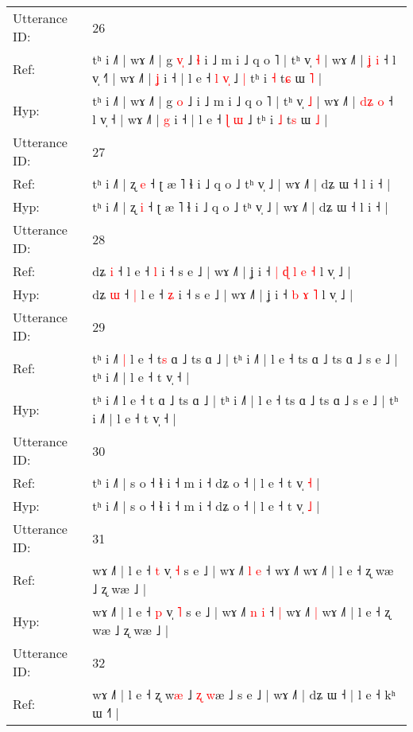 \documentclass[10pt]{article}
\DeclareRobustCommand{\hl}[1]{{\textcolor{red}{#1}}}
\begin{document}
\begin{longtable}{ll}
 \\
\midrule
Utterance ID: & 26 \\
Ref: & tʰ i ˩˥ | wɤ ˩˥ | g \hl{v}\hl{̩} ˩\hl{ }\hl{ɬ} i ˩ m i ˩ q o ˥ | tʰ v̩ \hl{˧} | wɤ ˩˥ | \hl{}\hl{ʝ} \hl{i} ˧ l v̩ ˧\hl{˥} | wɤ ˩˥ | \hl{ʝ} i ˧ | l e ˧ \hl{l} \hl{v}\hl{̩} ˩\hl{ }\hl{|} tʰ i \hl{˧} t\hl{ɕ} ɯ \hl{˥} |
 \\
Hyp: & tʰ i ˩˥ | wɤ ˩˥ | g \hl{}\hl{o} ˩\hl{}\hl{} i ˩ m i ˩ q o ˥ | tʰ v̩ \hl{˩} | wɤ ˩˥ | \hl{d}\hl{ʑ} \hl{o} ˧ l v̩ ˧\hl{} | wɤ ˩˥ | \hl{g} i ˧ | l e ˧ \hl{ɭ} \hl{}\hl{ɯ} ˩\hl{}\hl{} tʰ i \hl{˩} t\hl{s} ɯ \hl{˩} |
 \\
\midrule
Utterance ID: & 27 \\
Ref: & tʰ i ˩˥ | ʐ \hl{e} ˧ ʈ æ ˥ ɬ i ˩ q o ˩ tʰ v̩ ˩ | wɤ ˩˥ | dʑ ɯ ˧ l i ˧ |
 \\
Hyp: & tʰ i ˩˥ | ʐ \hl{i} ˧ ʈ æ ˥ ɬ i ˩ q o ˩ tʰ v̩ ˩ | wɤ ˩˥ | dʑ ɯ ˧ l i ˧ |
 \\
\midrule
Utterance ID: & 28 \\
Ref: & dʑ \hl{i} ˧\hl{}\hl{} l e ˧ \hl{l} i ˧ s e ˩ | wɤ ˩˥ | ʝ i ˧\hl{ }\hl{|}\hl{ }\hl{ɖ} \hl{l} \hl{e} \hl{˧} l v̩ ˩ |
 \\
Hyp: & dʑ \hl{ɯ} ˧\hl{ }\hl{|} l e ˧ \hl{ʑ} i ˧ s e ˩ | wɤ ˩˥ | ʝ i ˧\hl{}\hl{}\hl{}\hl{} \hl{b} \hl{ɤ} \hl{˥} l v̩ ˩ |
 \\
\midrule
Utterance ID: & 29 \\
Ref: & tʰ i ˩˥\hl{ }\hl{|} l e ˧ t\hl{s} ɑ ˩ ts ɑ ˩ | tʰ i ˩˥ | l e ˧ ts ɑ ˩ ts ɑ ˩ s e ˩ | tʰ i ˩˥ | l e ˧ t v̩ ˧ |
 \\
Hyp: & tʰ i ˩˥\hl{}\hl{} l e ˧ t\hl{} ɑ ˩ ts ɑ ˩ | tʰ i ˩˥ | l e ˧ ts ɑ ˩ ts ɑ ˩ s e ˩ | tʰ i ˩˥ | l e ˧ t v̩ ˧ |
 \\
\midrule
Utterance ID: & 30 \\
Ref: & tʰ i ˩˥ | s o ˧ ɬ i ˧ m i ˧ dʑ o ˧ | l e ˧ t v̩ \hl{˧} |
 \\
Hyp: & tʰ i ˩˥ | s o ˧ ɬ i ˧ m i ˧ dʑ o ˧ | l e ˧ t v̩ \hl{˩} |
 \\
\midrule
Utterance ID: & 31 \\
Ref: & wɤ ˩˥ | l e ˧ \hl{t} v̩ \hl{˧} s e ˩ | wɤ ˩˥ \hl{l} \hl{e} ˧\hl{}\hl{} wɤ ˩˥\hl{}\hl{} wɤ ˩˥ | l e ˧ ʐ wæ ˩ ʐ wæ ˩ |
 \\
Hyp: & wɤ ˩˥ | l e ˧ \hl{p} v̩ \hl{˥} s e ˩ | wɤ ˩˥ \hl{n} \hl{i} ˧\hl{ }\hl{|} wɤ ˩˥\hl{ }\hl{|} wɤ ˩˥ | l e ˧ ʐ wæ ˩ ʐ wæ ˩ |
 \\
\midrule
Utterance ID: & 32 \\
Ref: & wɤ ˩˥ | l e ˧ ʐ w\hl{æ} ˩ \hl{ʐ} \hl{w}æ ˩ s e ˩ | wɤ ˩˥ | dʑ ɯ ˧ | l e ˧ kʰ ɯ ˧˥ |

\end{longtable}
\end{document}
